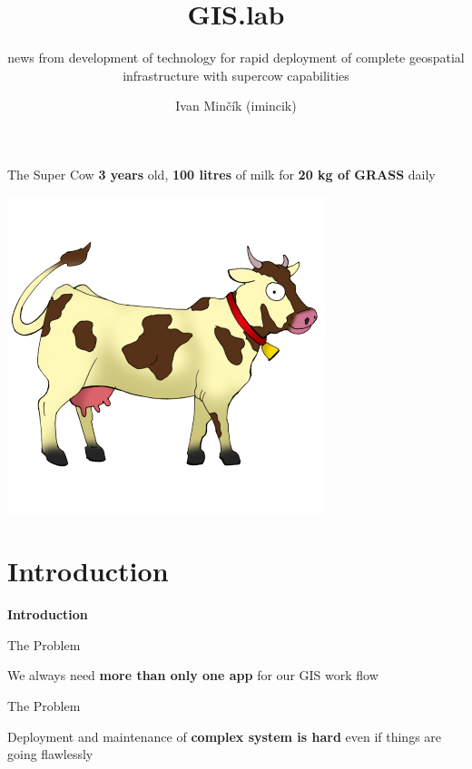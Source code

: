 \documentclass[12pt]{beamer}
\title{GIS.lab}
\subtitle{news from development of technology for rapid deployment of complete geospatial infrastructure with supercow capabilities}
\author{Ivan Minčík (imincik)}
\institute{FOSS4G Europe 2015, Como, Italy}
\date{}
\begin{document}
\begin{frame}
	\titlepage
\end{frame}

\begin{frame}{The Super Cow}
	\textbf{3 years} old, \textbf{100 litres} of milk for \textbf{20 kg of GRASS} daily
	\begin{center}
		\includegraphics[keepaspectratio=true,height=0.6\textheight]{images/cow.png}
	\end{center}
\end{frame}


\section{Introduction}
\begin{frame}
	\begin{center}
		\LARGE\textbf{Introduction}	
	\end{center}
\end{frame}

\begin{frame}{The Problem}
	\begin{center}
		We always need \textbf{more than only one app} for our GIS work flow
	\end{center}
\end{frame}

\begin{frame}{The Problem}
	\begin{center}
		Deployment and maintenance of \textbf{complex system is hard} even if things are going flawlessly
		\end{center}
\end{frame}
\end{document}
